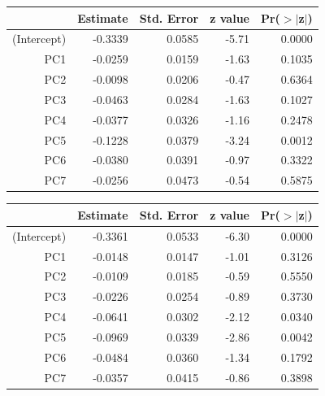 \documentclass[a4paper,12pt]{Latex/Classes/PhDthesisPSnPDF}
\begin{document}
\newpage
\begin{center}
\begin{table}[ht]
\centering
\begin{tabular}{rrrrr}
  \hline
 & Estimate & Std. Error & z value & Pr($>$$|$z$|$) \\ 
  \hline
(Intercept) & -0.3339 & 0.0585 & -5.71 & 0.0000 \\ 
  PC1 & -0.0259 & 0.0159 & -1.63 & 0.1035 \\ 
  PC2 & -0.0098 & 0.0206 & -0.47 & 0.6364 \\ 
  PC3 & -0.0463 & 0.0284 & -1.63 & 0.1027 \\ 
  PC4 & -0.0377 & 0.0326 & -1.16 & 0.2478 \\ 
  PC5 & -0.1228 & 0.0379 & -3.24 & 0.0012 \\ 
  PC6 & -0.0380 & 0.0391 & -0.97 & 0.3322 \\ 
  PC7 & -0.0256 & 0.0473 & -0.54 & 0.5875 \\ 
   \hline
\end{tabular}
\end{table}\end{center}
\begin{center}
\begin{table}[ht]
\centering
\begin{tabular}{rrrrr}
  \hline
 & Estimate & Std. Error & z value & Pr($>$$|$z$|$) \\ 
  \hline
(Intercept) & -0.3361 & 0.0533 & -6.30 & 0.0000 \\ 
  PC1 & -0.0148 & 0.0147 & -1.01 & 0.3126 \\ 
  PC2 & -0.0109 & 0.0185 & -0.59 & 0.5550 \\ 
  PC3 & -0.0226 & 0.0254 & -0.89 & 0.3730 \\ 
  PC4 & -0.0641 & 0.0302 & -2.12 & 0.0340 \\ 
  PC5 & -0.0969 & 0.0339 & -2.86 & 0.0042 \\ 
  PC6 & -0.0484 & 0.0360 & -1.34 & 0.1792 \\ 
  PC7 & -0.0357 & 0.0415 & -0.86 & 0.3898 \\ 
   \hline
\end{tabular}
\end{table}\end{center}
\end{document}
